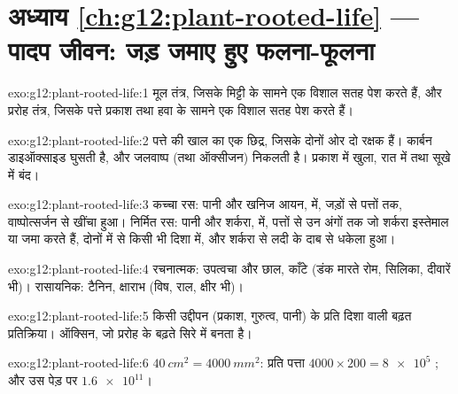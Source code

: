\section*{अध्याय \ref{ch:g12:plant-rooted-life} --- पादप जीवन: जड़ जमाए हुए फलना-फूलना}

\begin{solution}{exo:g12:plant-rooted-life:1}
मूल तंत्र, जिसके  मिट्टी के सामने एक विशाल सतह पेश करते हैं, और
प्ररोह तंत्र, जिसके पत्ते प्रकाश तथा हवा के सामने एक विशाल सतह पेश करते
हैं।
\end{solution}

\begin{solution}{exo:g12:plant-rooted-life:2}
पत्ते की खाल का एक छिद्र, जिसके दोनों ओर दो रक्षक  हैं। कार्बन
डाइऑक्साइड घुसती है, और जलवाष्प (तथा ऑक्सीजन) निकलती है। प्रकाश में खुला,
रात में तथा सूखे में बंद।
\end{solution}

\begin{solution}{exo:g12:plant-rooted-life:3}
कच्चा रस: पानी और खनिज आयन,  में, जड़ों से पत्तों तक, वाष्पोत्सर्जन से
खींचा हुआ। निर्मित रस: पानी और शर्करा,  में, पत्तों से उन अंगों तक जो
शर्करा इस्तेमाल या जमा करते हैं, दोनों में से किसी भी दिशा में, और शर्करा
से लदी  के दाब से धकेला हुआ।
\end{solution}

\begin{solution}{exo:g12:plant-rooted-life:4}
रचनात्मक: उपत्वचा और छाल, काँटे (डंक मारते रोम, सिलिका,  दीवारें
भी)। रासायनिक: टैनिन, क्षाराभ (विष, राल, क्षीर भी)।
\end{solution}

\begin{solution}{exo:g12:plant-rooted-life:5}
किसी उद्दीपन (प्रकाश, गुरुत्व, पानी) के प्रति दिशा वाली बढ़त प्रतिक्रिया।
ऑक्सिन, जो प्ररोह के बढ़ते सिरे में बनता है।
\end{solution}

\begin{solution}{exo:g12:plant-rooted-life:6}
$\qty{40}{cm^2} = \qty{4000}{mm^2}$: प्रति पत्ता $4000 \times 200 = \num{8e5}$
; और उस पेड़ पर $\num{1.6e11}$।
\end{solution}

